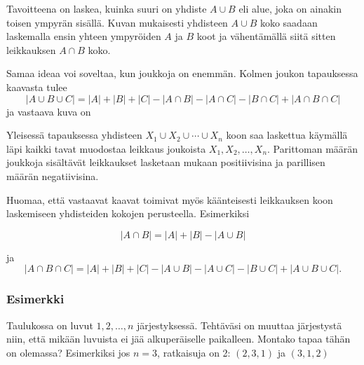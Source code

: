 Tavoitteena on laskea, kuinka suuri on yhdiste $A \cup B$
eli alue, joka on ainakin toisen ympyrän sisällä.
Kuvan mukaisesti yhdisteen $A \cup B$ koko
saadaan laskemalla ensin yhteen ympyröiden $A$ ja $B$ koot
ja vähentämällä siitä sitten leikkauksen $A \cap B$ koko.

Samaa ideaa voi soveltaa, kun joukkoja on enemmän.
Kolmen joukon tapauksessa kaavasta tulee
\[ |A \cup B \cup C| = |A| + |B| + |C| - |A \cap B|  - |A \cap C|  - |B \cap C| + |A \cap B \cap C| \]
ja vastaava kuva on


\begin{center}
\end{center}

Yleisessä tapauksessa yhdisteen $X_1 \cup X_2 \cup \cdots \cup X_n$
koon saa laskettua käymällä läpi kaikki tavat muodostaa
leikkaus joukoista $X_1,X_2,\ldots,X_n$.
Parittoman määrän joukkoja sisältävät leikkaukset
lasketaan mukaan positiivisina ja
parillisen määrän negatiivisina.

Huomaa, että vastaavat kaavat toimivat myös käänteisesti
leikkauksen koon laskemiseen yhdisteiden kokojen perusteella.
Esimerkiksi

\[ |A \cap B| = |A| + |B| - |A \cup B|\]

ja
\[ |A \cap B \cap C| = |A| + |B| + |C| - |A \cup B|  - |A \cup C|  - |B \cup C| + |A \cup B \cup C| .\]

\subsubsection*{Esimerkki}

\begin{task}
Taulukossa on luvut $1,2,\ldots,n$ järjestyksessä.
Tehtäväsi on muuttaa järjestystä niin,
että mikään luvuista ei jää alkuperäiselle paikalleen.
Montako tapaa tähän on olemassa?
Esimerkiksi jos $n=3$, ratkaisuja on 2: $(2,3,1)$ ja $(3,1,2)$
\end{task}

